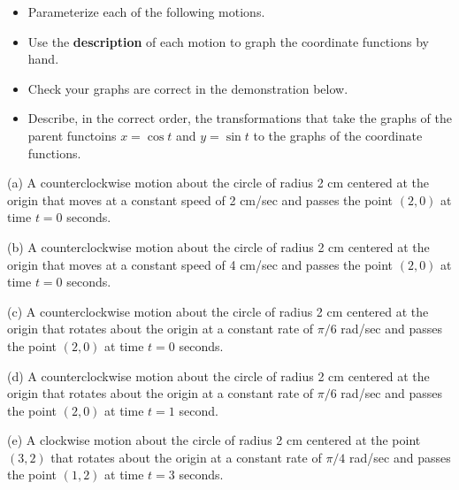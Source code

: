 \documentclass{ximera}
\begin{document}
\begin{example}
\begin{itemize}

\item{Parameterize each of the following motions.}

\item{Use the {\bf description} of each motion to graph the coordinate functions by hand.}

\item{Check your graphs are correct in the demonstration below.}

\item{Describe, in the correct order, the transformations that take the graphs of the parent functoins $x=\cos t$ and $y=\sin t$ to the graphs of the coordinate functions.}

\end{itemize}

(a) A counterclockwise motion about the circle of radius 2 cm centered at the origin that moves at a constant speed of 2 cm/sec and passes the point $(2,0)$ at time $t=0$ seconds.

(b) A counterclockwise motion about the circle of radius 2 cm centered at the origin that moves at a constant speed of 4 cm/sec and passes the point $(2,0)$ at time $t=0$ seconds.

(c) A counterclockwise motion about the circle of radius 2 cm centered at the origin that rotates about the origin at a constant rate of $\pi/6$ rad/sec and passes the point $(2,0)$ at time $t=0$ seconds.

(d) A counterclockwise motion about the circle of radius 2 cm centered at the origin that rotates about the origin at a constant rate of $\pi/6$ rad/sec and passes the point $(2,0)$ at time $t=1$ second.

(e) A clockwise motion about the circle of radius 2 cm centered at the point $(3,2)$ that rotates about the origin at a constant rate of $\pi/4$ rad/sec and passes the point $(1,2)$ at time $t=3$ seconds.

\begin{exploration}
 
\begin{onlineOnly}
    \begin{center}
\end{center}
\end{onlineOnly}
\end{exploration}


\end{example}
\end{document}
